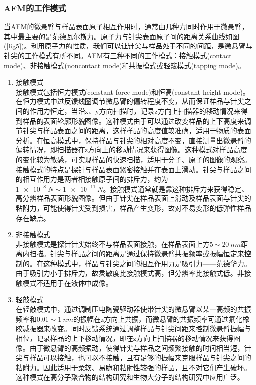 \documentclass[a4paper]{article}
\begin{document}
\subsubsection{AFM的工作模式}
当AFM的微悬臂与样品表面原子相互作用时，通常由几种力同时作用于微悬臂，其中最主要的是范德瓦尔斯力。原子力与针尖表面原子间的距离关系曲线如图(\ref{fig5})。利用原子力的性质，我们可以让针尖与样品处于不同的间距，是微悬臂与针尖的工作模式有所不同。AFM有三种不同的工作模式：接触模式(contact mode)、非接触模式(noncontact mode)和共振模式或轻敲模式(tapping mode)。
\begin{enumerate}
\item 接触模式\\
接触模式包括恒力模式(constant force mode)和恒高(constant height mode)。在恒力模式中过反馈线圈调节微悬臂的偏转程度不变，从而保证样品与针尖之间的作用力恒定，当沿x、y方向扫描时，记录z方向上扫描器的移动情况来得到样品的表面轮廓形貌图像。这种模式由于可以通过改变样品的上下高度来调节针尖与样品表面之间的距离，这样样品的高度值较准确，适用于物质的表面分析。在恒高模式中，保持样品与针尖的相对高度不变，直接测量出微悬臂的偏转情况，即扫描器在z方向上的移动情况来获得图像。这种模式对样品高度的变化较为敏感，可实现样品的快速扫描，适用于分子、原子的图像的观察。接触模式的特点是探针与样品表面紧密接触并在表面上滑动。针尖与样品之间的相互作用力是两者相接触原子间的排斥力，约为$\SI{1e-8}{N}\sim\SI{1e-11}{N}$。接触模式通常就是靠这种排斥力来获得稳定、高分辨样品表面形貌图像。但由于针尖在样品表面上滑动及样品表面与针尖的粘附力，可能使得针尖受到损害，样品产生变形，故对不易变形的低弹性样品存在缺点。
\item 非接触模式\\
非接触模式是探针针尖始终不与样品表面接触，在样品表面上方$5\sim\SI{20}{nm}$距离内扫描。针尖与样品之间的距离是通过保持微悬臂共振频率或振幅恒定来控制的。在这种模式中，样品与针尖之间的相互作用力是吸引力——范德华力。由于吸引力小于排斥力，故灵敏度比接触模式高，但分辨率比接触式低。非接触模式不适用于在液体中成像。
\item 轻敲模式\\
在轻敲模式中，通过调制压电陶瓷驱动器使带针尖的微悬臂以某一高频的共振频率和$0.01\sim\SI{1}{nm}$的振幅在z方向上共振，而微悬臂的共振频率可通过氟化橡胶减振器来改变。同时反馈系统通过调整样品与针尖间距来控制微悬臂振幅与相位，记录样品的上下移动情况，即在z方向上扫描器的移动情况来获得图像。由于微悬臂的高频振动，使得针尖与样品之间频繁接触的时间相当短，针尖与样品可以接触，也可以不接触，且有足够的振幅来克服样品与针尖之间的粘附力。因此适用于柔软、易脆和粘附性较强的样品，且不对它们产生破坏。这种模式在高分子聚合物的结构研究和生物大分子的结构研究中应用广泛。
\end{enumerate}
\end{document}
